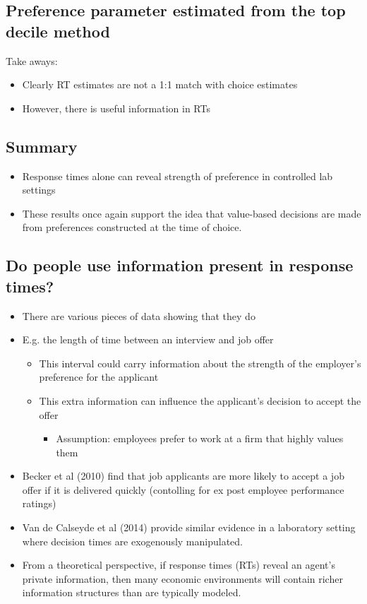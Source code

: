 \subsection{Preference parameter estimated from the top decile method}
Take aways: 
\begin{itemize}
    \item Clearly RT estimates are not a 1:1 match with choice estimates
    \item However, there is useful information in RTs
\end{itemize}

\subsection{Summary}
\begin{itemize}
    \item Response times alone can reveal strength of preference in controlled lab settings
    \item These results once again support the idea that value-based decisions are made from preferences constructed at the time of choice.
\end{itemize}
\subsection{Do people use information present in response times?}
\begin{itemize}
    \item There are various pieces of data showing that they do
    \item E.g. the length of time between an interview and job offer
    \begin{itemize}
        \item This interval could carry information about the strength of the employer's preference for the applicant
        \item This extra information can influence the applicant's decision to accept the offer
        \begin{itemize}
            \item Assumption: employees prefer to work at a firm that highly values them
        \end{itemize}
    \end{itemize}
    \item Becker et al (2010) find that job applicants are more likely to accept a job offer if it is delivered quickly (contolling for ex post employee performance ratings) 
    \item Van de Calseyde et al (2014) provide similar evidence in a laboratory setting where decision times are exogenously manipulated.
    \item From a theoretical perspective, if response times (RTs) reveal an agent's private information, then many economic environments will contain richer information structures than are typically modeled.
\end{itemize}

